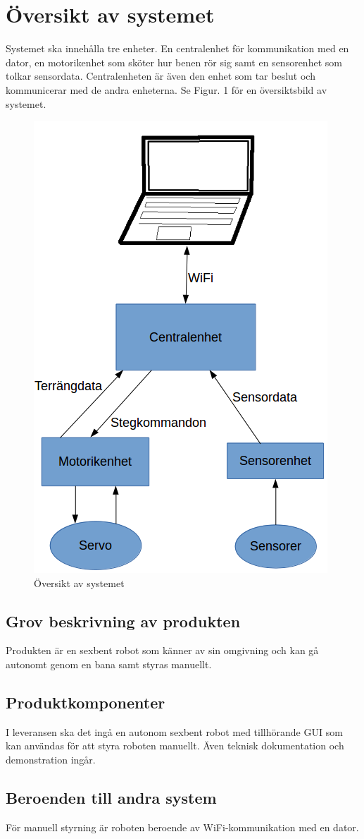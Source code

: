 \documentclass[a4paper,titlepage,12pt]{article}
\begin{document}
  \newpage
	\section{Översikt av systemet}
	Systemet ska innehålla tre enheter. En centralenhet för kommunikation med en dator, en motorikenhet
	som sköter hur benen rör sig samt en sensorenhet som tolkar sensordata. Centralenheten är även den enhet som
	tar beslut och kommunicerar med de andra enheterna. Se Figur. 1 för en översiktsbild av systemet.
	\begin{figure}[h]
		\centering
		\includegraphics[width=0.5\linewidth]{../images/overview.png}
		\caption{Översikt av systemet\label{fig:overview}}
	\end{figure}

	\subsection{Grov beskrivning av produkten}
	Produkten är en sexbent robot som känner av sin omgivning och kan gå autonomt
	genom en bana samt styras manuellt.
	\subsection{Produktkomponenter}
	I leveransen ska det ingå en autonom sexbent robot med tillhörande GUI som kan användas för att 
	styra roboten manuellt. Även teknisk dokumentation och demonstration ingår. 
	\subsection{Beroenden  till andra system}
    För manuell styrning är roboten beroende av WiFi-kommunikation med en dator.
\end{document}
